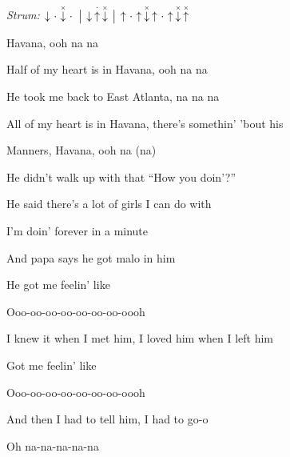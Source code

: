 \begin{song}


\begin{headerbox}
\RaiseBoxWithChucks
\textit{Strum:} $\Down\Miss\ChuckDown\Miss \Separator \Down\StaccatoUp\ChuckDown \Separator \Up\Miss\Up\ChuckDown\Up\Miss\Up\ChuckDown\ChuckUp$
\end{headerbox}

\begin{hchordbox}
\end{hchordbox}

\Large

\bigskip

Havana, ooh na na  \par
Half of my heart is in Havana, ooh na na  \par
He took me back to East Atlanta, na na na  \par
All of my heart is in Havana, there's somethin' 'bout his \par
{}Manners, Havana, ooh na (na) \par

\bigskip

He didn't walk up with that ``How you doin'?'' \par
{} \par
He said there's a lot of girls I can do with \par
{} \par
I'm doin' forever in a minute \par
{} \par
And papa says he got malo in him \par

\bigskip

He got me feelin' like \par
{}Ooo-oo-oo-oo-oo-oo-oo-oooh \par
I knew it when I met him, I loved him when I left him \par
Got me feelin' like \par
{}Ooo-oo-oo-oo-oo-oo-oo-oooh \par
And then I had to tell him, I had to go-o \par
Oh na-na-na-na-na \par


\end{song}
